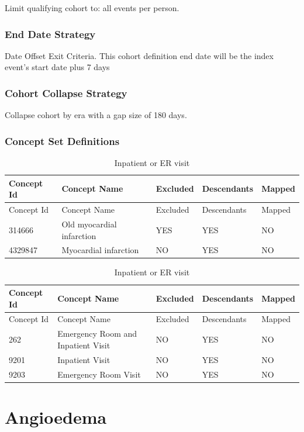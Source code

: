 \documentclass[11pt]{book}
\theoremstyle{definition}
\theoremstyle{definition}
\theoremstyle{definition}
\theoremstyle{remark}
\begin{document}
Limit qualifying cohort to: all events per person.

\subsubsection*{End Date Strategy}\label{end-date-strategy-2}

Date Offset Exit Criteria. This cohort definition end date will be the
index event's start date plus 7 days

\subsubsection*{Cohort Collapse
Strategy}\label{cohort-collapse-strategy-2}

Collapse cohort by era with a gap size of 180 days.

\subsubsection*{Concept Set
Definitions}\label{concept-set-definitions-2}

\begin{longtable}[]{@{}lllll@{}}
\caption{\label{tab:ami} Inpatient or ER visit}\tabularnewline
\toprule
Concept Id & Concept Name & Excluded & Descendants &
Mapped\tabularnewline
\midrule
\endfirsthead
\toprule
Concept Id & Concept Name & Excluded & Descendants &
Mapped\tabularnewline
\midrule
\endhead
314666 & Old myocardial infarction & YES & YES & NO\tabularnewline
4329847 & Myocardial infarction & NO & YES & NO\tabularnewline
\bottomrule
\end{longtable}

\begin{longtable}[]{@{}lllll@{}}
\caption{\label{tab:inpatientOrErAmi} Inpatient or ER visit}\tabularnewline
\toprule
Concept Id & Concept Name & Excluded & Descendants &
Mapped\tabularnewline
\midrule
\endfirsthead
\toprule
Concept Id & Concept Name & Excluded & Descendants &
Mapped\tabularnewline
\midrule
\endhead
262 & Emergency Room and Inpatient Visit & NO & YES & NO\tabularnewline
9201 & Inpatient Visit & NO & YES & NO\tabularnewline
9203 & Emergency Room Visit & NO & YES & NO\tabularnewline
\bottomrule
\end{longtable}

\section{Angioedema}\label{Angioedema}
\end{document}
